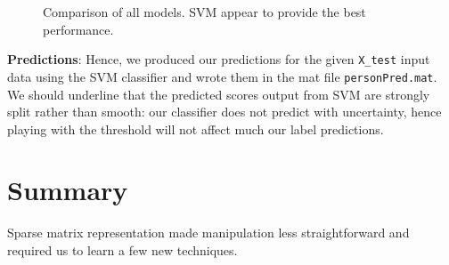 \documentclass[10pt,a4paper]{article}
\begin{document}
   \begin{figure}[ht]
       \center
    	\hfill
	\caption{Comparison of all models. SVM appear to provide the best performance.}
  \end{figure}

  \textbf{Predictions}: Hence, we produced our predictions for the given \texttt{X\_test} input data using the SVM classifier and wrote them in the mat file \texttt{personPred.mat}. We should underline that the predicted scores output from SVM are strongly split rather than smooth: our classifier does not predict with uncertainty, hence playing with the threshold will not affect much our label predictions.

\section{Summary}
  Sparse matrix representation made manipulation less straightforward and required us to learn a few new techniques.
\end{document}
